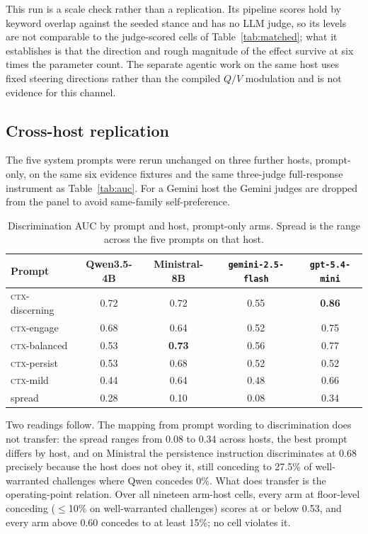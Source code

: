 This run is a scale check rather than a replication. Its pipeline scores hold by keyword
overlap against the seeded stance and has no LLM judge, so its levels are not comparable to
the judge-scored cells of Table~\ref{tab:matched}; what it establishes is that the direction
and rough magnitude of the effect survive at six times the parameter count. The separate
agentic work on the same host uses fixed steering directions rather than the compiled
\(Q/V\) modulation and is not evidence for this channel.

\subsection{Cross-host replication}
\label{app:crosshost}
The five system prompts were rerun unchanged on three further hosts, prompt-only, on the same
six evidence fixtures and the same three-judge full-response instrument as
Table~\ref{tab:auc}. For a Gemini host the Gemini judges are dropped from the panel to avoid
same-family self-preference.

\begin{table}[htbp]
\centering
\setlength{\tabcolsep}{4pt}
\caption{Discrimination AUC by prompt and host, prompt-only arms. Spread is the range across
the five prompts on that host.}
\label{tab:crosshost}
\small
\begin{tabular}{lcccc}
\toprule
Prompt & Qwen3.5-4B & Ministral-8B & \texttt{gemini-2.5-flash} & \texttt{gpt-5.4-mini} \\
\midrule
\textsc{ctx}-discerning & 0.72 & 0.72 & 0.55 & \textbf{0.86} \\
\textsc{ctx}-engage & 0.68 & 0.64 & 0.52 & 0.75 \\
\textsc{ctx}-balanced & 0.53 & \textbf{0.73} & 0.56 & 0.77 \\
\textsc{ctx}-persist & 0.53 & 0.68 & 0.52 & 0.52 \\
\textsc{ctx}-mild & 0.44 & 0.64 & 0.48 & 0.66 \\
\midrule
spread & 0.28 & 0.10 & 0.08 & 0.34 \\
\bottomrule
\end{tabular}
\end{table}

Two readings follow. The mapping from prompt wording to discrimination does not transfer: the
spread ranges from 0.08 to 0.34 across hosts, the best prompt differs by host, and on Ministral
the persistence instruction discriminates at 0.68 precisely because the host does not obey it,
still conceding to 27.5\% of well-warranted challenges where Qwen concedes 0\%. What does
transfer is the operating-point relation. Over all nineteen arm-host cells, every arm at
floor-level conceding (\(\le\)10\% on well-warranted challenges) scores at or below 0.53, and
every arm above 0.60 concedes to at least 15\%; no cell violates it.

